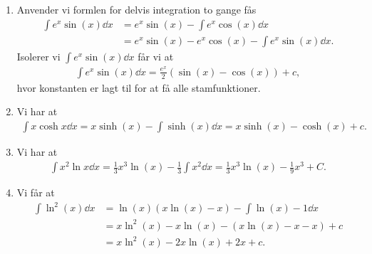 \begin{enumerate}
	\item\label{it:int22} Anvender vi formlen for delvis integration to gange fås
	\begin{align*}
	\int e^{x}\sin(x) \dd x&=e^x\sin (x)-\int e^x\cos(x)\dd x\\&=e^x\sin(x)-e^x\cos(x)-\int e^x\sin(x)\dd x.
	\end{align*}
	Isolerer vi $ \int e^x\sin(x)\dd x $ får vi at
	\begin{align*}
	\int e^{x}\sin(x) \dd x=\frac{e^x}{2}(\sin(x)-\cos(x))+c,
	\end{align*}
	hvor konstanten er lagt til for at få alle stamfunktioner.
	
	\item Vi har at
	\begin{align*}
	\int x\cosh x \dd x=x\sinh(x)-\int \sinh(x)\dd x=x\sinh(x)-\cosh(x)+c.
	\end{align*}

	
	\item Vi har at
	\begin{align*}
	\int x^2\ln x\dd x=\frac{1}{3}x^3\ln(x)-\frac{1}{3}\int x^2\dd x=\frac{1}{3}x^3\ln(x)-\frac{1}{9}x^3+C.
	\end{align*}
	
	\item Vi får at
	\begin{align*}
	\int \ln^2(x)\dd x&=\ln(x)(x\ln(x)-x)-\int \ln(x)-1\dd x\\&=x\ln^2(x)-x\ln(x)-(x\ln(x)-x-x)+c\\&=x\ln^2(x)-2x\ln(x)+2x+c.
	\end{align*}
\end{enumerate}